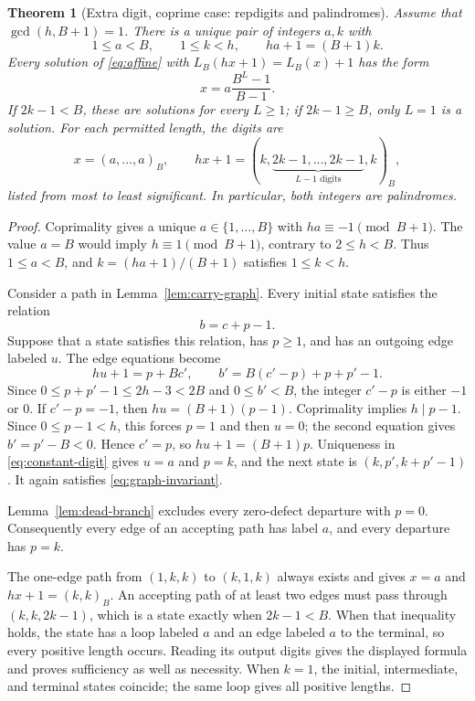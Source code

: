 \documentclass[11pt]{amsart}
\newtheorem{theorem}{Theorem}[section]
\theoremstyle{remark}\newtheorem{remark}[theorem]{Remark}
\begin{document}
\begin{theorem}[Extra digit, coprime case: repdigits and palindromes]\label{thm:extra}
Assume that $\gcd(h,B+1)=1$.
There is a unique pair of integers $a,k$ with
\begin{equation}\label{eq:constant-digit}
 1\le a<B,\qquad 1\le k<h,\qquad ha+1=(B+1)k.
\end{equation}
Every solution of \eqref{eq:affine} with $L_B(hx+1)=L_B(x)+1$ has the form
\begin{equation}\label{eq:repdigit}
 x=a\frac{B^L-1}{B-1}.
\end{equation}
If $2k-1<B$, these are solutions for every $L\ge1$; if $2k-1\ge B$, only $L=1$ is a solution.
For each permitted length, the digits are
\[
 x=(a,\ldots,a)_B,\qquad
 hx+1=(k,\underbrace{2k-1,\ldots,2k-1}_{L-1\text{ digits}},k)_B,
\]
listed from most to least significant.
In particular, both integers are palindromes.
\end{theorem}
\begin{proof}
Coprimality gives a unique $a\in\{1,\ldots,B\}$ with $ha\equiv-1\pmod{B+1}$.
The value $a=B$ would imply $h\equiv1\pmod{B+1}$, contrary to $2\le h<B$.
Thus $1\le a<B$, and $k=(ha+1)/(B+1)$ satisfies $1\le k<h$.

Consider a path in Lemma~\ref{lem:carry-graph}.
Every initial state satisfies the relation
\begin{equation}\label{eq:graph-invariant}
 b=c+p-1.
\end{equation}
Suppose that a state satisfies this relation, has $p\ge1$, and has an outgoing edge labeled $u$.
The edge equations become
\begin{equation}\label{eq:graph-reduced}
 hu+1=p+Bc',\qquad b'=B(c'-p)+p+p'-1.
\end{equation}
Since $0\le p+p'-1\le2h-3<2B$ and $0\le b'<B$, the integer $c'-p$ is either $-1$ or 0.
If $c'-p=-1$, then $hu=(B+1)(p-1)$.
Coprimality implies $h\mid p-1$. Since $0\le p-1<h$, this forces $p=1$ and then $u=0$; the second equation gives $b'=p'-B<0$.
Hence $c'=p$, so $hu+1=(B+1)p$.
Uniqueness in \eqref{eq:constant-digit} gives $u=a$ and $p=k$, and the next state is
$(k,p',k+p'-1)$.
It again satisfies \eqref{eq:graph-invariant}.

Lemma~\ref{lem:dead-branch} excludes every zero-defect departure with $p=0$.
Consequently every edge of an accepting path has label $a$, and every departure has $p=k$.

The one-edge path from $(1,k,k)$ to $(k,1,k)$ always exists and gives $x=a$ and $hx+1=(k,k)_B$.
An accepting path of at least two edges must pass through $(k,k,2k-1)$, which is a state exactly when $2k-1<B$.
When that inequality holds, the state has a loop labeled $a$ and an edge labeled $a$ to the terminal, so every positive length occurs.
Reading its output digits gives the displayed formula and proves sufficiency as well as necessity.
When $k=1$, the initial, intermediate, and terminal states coincide; the same loop gives all positive lengths.
\end{proof}
\end{document}

